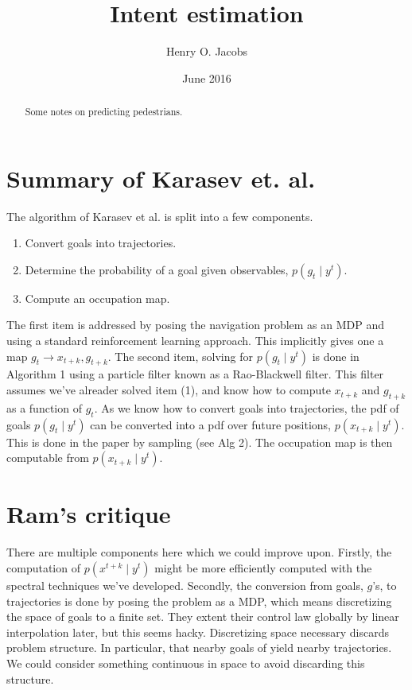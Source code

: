 \documentclass[12pt]{amsart}
\title{Intent estimation}
\author{Henry O. Jacobs}
\date{June 2016}
\begin{document}
\maketitle

\begin{abstract}
    Some notes on predicting pedestrians.
\end{abstract}

\section{Summary of Karasev et. al.}

The algorithm of Karasev et al. is split into a few components.

\begin{enumerate}
	\item Convert goals into trajectories.
        \item Determine the probability of a goal given observables, $p(g_t \mid y^t)$.
        \item Compute an occupation map.
\end{enumerate}
The first item is addressed by posing the navigation problem as an MDP and using a standard reinforcement learning approach.
This implicitly gives one a map $g_t \to x_{t+k}, g_{t+k}$.
The second item, solving for $p(g_t \mid y^t)$ is done in Algorithm 1 using a particle filter known as a Rao-Blackwell filter.
This filter assumes we've alreader solved item (1), and know how to compute $x_{t+k}$ and $g_{t+k}$ as a function of $g_t$.
As we know how to convert goals into trajectories, the pdf of goals $p(g_t \mid y^t)$ can be converted into a pdf over future positions, $p( x_{t+k} \mid y^t)$.  This is done in the paper by sampling (see Alg 2). 
The occupation map is then computable from $p(x_{t+k} \mid y^t)$.

\section{Ram's critique}
There are multiple components here which we could improve upon.
Firstly, the computation of $p(x^{t+k} \mid y^t)$ might be more efficiently computed with the spectral techniques we've developed.
Secondly, the conversion from goals, $g$'s, to trajectories is done by posing the problem as a MDP, which means discretizing the space of goals to a finite set.
They extent their control law globally by linear interpolation later, but this seems hacky.
Discretizing space necessary discards problem structure.
In particular, that nearby goals of yield nearby trajectories.
We could consider something continuous in space to avoid discarding this structure.
\end{document}
